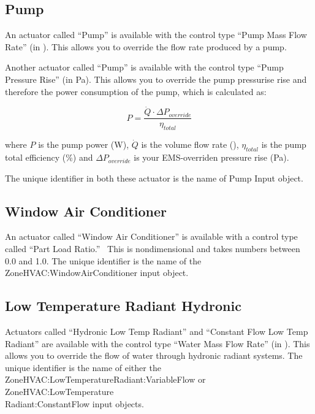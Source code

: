 \subsection{Pump}\label{pump}

An actuator called ``Pump'' is available with the control type ``Pump Mass Flow Rate'' (in \si{\massFlowRate}). This allows you to override the flow rate produced by a pump.

Another actuator called ``Pump'' is available with the control type ``Pump Pressure Rise'' (in \si{\pascal}). This allows you to override the pump pressurise rise and therefore the power consumption of the pump, which is calculated as:

\begin{equation}
    P = \frac{\dot{Q} \cdot \Delta P_{override}}{\eta_{total}}
\end{equation}

where $P$ is the pump power (\si{\watt}), $\dot{Q}$ is the volume flow rate (\si{\volumeFlowRate}), $\eta_{total}$ is the pump total efficiency (\%)
and $\Delta P_{override}$ is your EMS-overriden pressure rise (\si{\pascal}).

The unique identifier in both these actuator is the name of Pump Input object.

\subsection{Window Air Conditioner}\label{window-air-conditioner}

An actuator called ``Window Air Conditioner'' is available with a control type called ``Part Load Ratio.''~ This is nondimensional and takes numbers between 0.0 and 1.0. The unique identifier is the name of the ZoneHVAC:WindowAirConditioner input object.

\subsection{Low Temperature Radiant Hydronic}\label{low-temperature-radiant-hydronic}

Actuators called ``Hydronic Low Temp Radiant'' and ``Constant Flow Low Temp Radiant'' are available with the control type ``Water Mass Flow Rate'' (in \si{\massFlowRate}). This allows you to override the flow of water through hydronic radiant systems. The unique identifier is the name of either the ZoneHVAC:LowTemperatureRadiant:VariableFlow or ZoneHVAC:LowTemperature\\
Radiant:ConstantFlow input objects.

